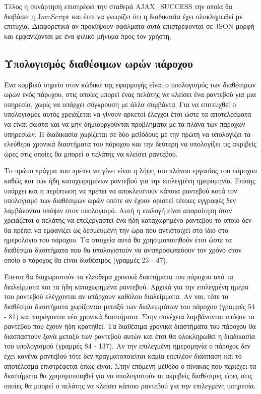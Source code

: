 Τέλος η συνάρτηση επιστρέφει την σταθερά AJAX\_SUCCESS την οποία θα διαβάσει η JavaScript και έτσι να γνωρίζει ότι η διαδικασία έχει ολοκληρωθεί με επιτυχία. Διαφορετικά αν προκύψουν σφάλματα αυτά επιστρέφονται σε JSON μορφή και εμφανίζονται με ένα φιλικό μήνυμα προς τον χρήστη.

\subsection{Υπολογισμός διαθέσιμων ωρών πάροχου}
Ένα κομβικό σημείο στον κώδικα της εφαρμογής είναι ο υπολογισμός των διαθέσιμων ωρών ενός πάρoχου, στις οποίες μπορεί ένας πελάτης να κλείσει ένα ραντεβού για μια υπηρεσία, χωρίς να υπάρχει σύγκρουση με άλλα συμβάντα. Για να επιτευχθεί ο υπολογισμός αυτός χρειάζεται να γίνουν αρκετοί έλεγχοι έτσι ώστε τα αποτελέσματα να είναι σωστά και να μην δημιουργούνται προβλήματα με τα πλάνα των πάροχων υπηρεσιών. Η διαδικασία χωρίζεται σε δύο μεθόδους με την πρώτη να υπολογίζει τα ελεύθερα χρονικά διαστήματα του πάροχου και την δεύτερη να υπολογίζει τις ακριβείς ώρες στις οποίες θα μπορεί ο πελάτης να κλείσει ραντεβού.



Το πρώτο πράγμα που πρέπει να γίνει είναι η λήψη του πλάνου εργασίας του πάροχου καθώς και των ήδη καταχωρημένων ραντεβού για την επιλεγμένη ημερομηνία. Επίσης υπάρχει και η περίπτωση να πρέπει να αποκλειστούν κάποια ραντεβού κατά τον υπολογισμό των διαθέσιμων ωρών οπότε αν έχουν οριστεί τέτοιες εγγραφές δεν λαμβάνονται υπόψιν στον υπολογισμό. Αυτή η επιλογή είναι απαραίτητη όταν χρειάζεται ο πελάτης να επεξεργαστεί ένα ήδη καταχωρημένο ραντεβού το οποίο δεν θα πρέπει να εμφανίζει ως δεσμευμένη την ώρα που αντιστοιχεί στο ίδιο στο ημερολόγιο του πάροχου. Τα στοιχεία αυτά θα χρησιμοποιηθούν έτσι ώστε τα διαθέσιμα διαστήματα που θα υπολογιστούν να αντιπροσωπεύουν τον χρόνο στον οποίο ο πάροχος θα είναι διαθέσιμος (γραμμές 23 - 47).

Έπειτα θα διαχωριστούν τα ελεύθερα χρονικά διαστήματα του πάροχου από τα διαλείμματα και τα ήδη καταχωρημένα ραντεβού. Αρχικά για την επιλεγμένη ημέρα του ραντεβού ελέγχονται αν υπάρχουν καθόλου διαλείμματα. Αν ναι, τότε τα διαθέσιμα διαστήματα χωρίζονται μεταξύ των διαλειμμάτων του πάροχου (γραμμές 54 - 81) και παράγονται νέα χρονικά διαστήματα. Στην συνέχεια λαμβάνονται υπόψιν τα ραντεβού που έχουν ήδη κρατηθεί. Τα διαθέσιμα χρονικά διαστήματα του πάροχου θα διασπαστούν ξανά μεταξύ των ραντεβού αυτών και έτσι θα ολοκληρωθεί η διαδικασία του υπολογισμού (γραμμές 84 - 137). Αν την επιλεγμένη ημερομηνία ο πάροχος δεν έχει κανένα ραντεβού τότε δεν πραγματοποιείται καμία επιπλέον διάσπαση και το αποτέλεσμα επιστρέφεται όπως είναι. Στην επόμενη μέθοδο ο πίνακας που περιέχει τα διαστήματα θα χρησιμοποιηθεί για να υπολογιστούν οι ακριβείς διαθέσιμες ώρες στις οποίες θα μπορεί ο πελάτης να κλείσει κάποιο ραντεβού για την επιλεγμένη υπηρεσία.

